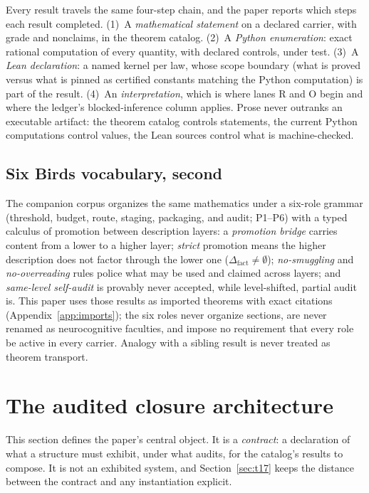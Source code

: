 \documentclass[11pt]{article}
\newcommand{\Dfact}{\Delta_{\mathrm{fact}}}
\theoremstyle{definition}
\begin{document}
Every result travels the same four-step chain, and the paper reports which
steps each result completed. (1)~A \emph{mathematical statement} on a declared
carrier, with grade and nonclaims, in the theorem catalog. (2)~A \emph{Python
enumeration}: exact rational computation of every quantity, with declared
controls, under test. (3)~A \emph{Lean declaration}: a named kernel per law,
whose scope boundary (what is proved versus what is pinned as certified
constants matching the Python computation) is part of the result.
(4)~An \emph{interpretation}, which is where lanes R and O begin and where the
ledger's blocked-inference column applies. Prose never outranks an executable
artifact: the theorem catalog controls statements, the current Python
computations control values, the Lean sources control what is machine-checked.

\subsection{Six Birds vocabulary, second}
\label{sec:sixbirds}

The companion corpus organizes the same mathematics under a six-role grammar
(threshold, budget, route, staging, packaging, and audit; P1--P6) with a typed
calculus of promotion between description layers: a \emph{promotion bridge}
carries content from a lower to a higher layer; \emph{strict} promotion means
the higher description does not factor through the lower one
($\Dfact\neq\emptyset$); \emph{no-smuggling} and \emph{no-overreading} rules
police what may be used and claimed across layers; and \emph{same-level
self-audit} is provably never accepted, while level-shifted, partial audit
is. This paper uses those results as imported theorems with exact citations
(Appendix~\ref{app:imports}); the six roles never organize sections, are never
renamed as neurocognitive faculties, and impose no requirement that every role
be active in every carrier. Analogy with a sibling result is never treated as
theorem transport.

 \section{The audited closure architecture}
\label{sec:arch}


This section defines the paper's central object. It is a \emph{contract}: a
declaration of what a structure must exhibit, under what audits, for the
catalog's results to compose. It is not an exhibited system, and
Section~\ref{sec:t17} keeps the distance between the contract and any
instantiation explicit.
\end{document}
